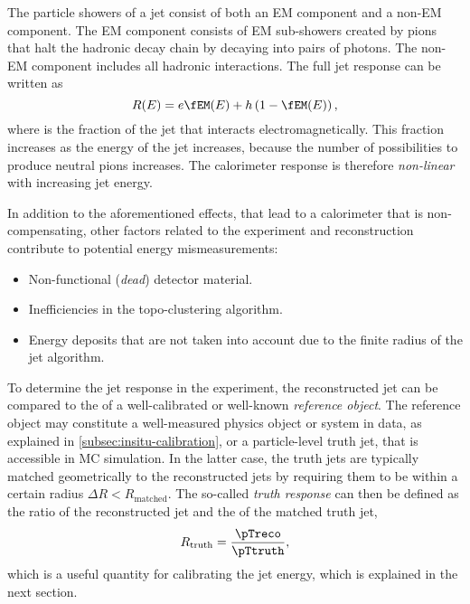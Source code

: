 The particle showers of a jet consist of both an EM component and a non-EM component. The EM component consists of EM sub-showers created by pions that halt the hadronic decay chain by decaying into pairs of photons. The non-EM component includes all hadronic interactions.
The full jet response can be written as
\begin{equation}
    R(E) = e\fEM(E) + h\left(1 - \fEM(E)\right),
\end{equation}
where \fEM is the fraction of the jet that interacts electromagnetically. This fraction increases as the energy of the jet increases, because the number of possibilities to produce neutral pions increases. The calorimeter response is therefore \emph{non-linear} with increasing jet energy.

In addition to the aforementioned effects, that lead to a calorimeter that is non-compensating, other factors related to the experiment and reconstruction contribute to potential energy mismeasurements:
\begin{itemize}
    \item Non-functional (\emph{dead}) detector material.
    \item Inefficiencies in the topo-clustering algorithm.
    \item Energy deposits that are not taken into account due to the finite radius of the jet algorithm.
\end{itemize}

To determine the jet response in the experiment, the reconstructed jet \pT can be compared to the \pT of a well-calibrated or well-known \emph{reference object}. The reference object may constitute a well-measured physics object or system in data, as explained in \cref{subsec:insitu-calibration}, or a particle-level truth jet, that is accessible in MC simulation.
In the latter case, the truth jets are typically matched geometrically to the reconstructed jets by requiring them to be within a certain radius $\Delta R < R_{\text{matched}}$.
The so-called \emph{truth response} can then be defined as the ratio of the reconstructed jet \pT and the \pT of the matched truth jet,
\begin{equation}
    R_{\text{truth}} =  \frac{\pTreco}{\pTtruth},
\end{equation}
which is a useful quantity for calibrating the jet energy, which is explained in the next section.


